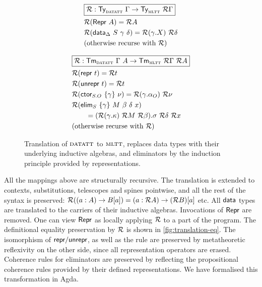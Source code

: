 \begin{figure}
\begin{minipage}[t]{0.5\textwidth}
\begin{align*}
&\boxed{\mathcal{R} : \textsf{Ty}_{{\textsc{datatt}}}\ \Gamma \to \textsf{Ty}_{{\textsc{mltt}}}\ \mathcal{R} \Gamma} \\
&\mathcal{R} (\textsf{Repr}\ A) = \mathcal{R} A \\
&\mathcal{R} (\textsf{data}_{\Delta}\ S\ \gamma\ \delta) = \mathcal{R} (\gamma.X)\ \mathcal{R} \delta \\
&\text{(otherwise recurse with $\mathcal{R}$)}
\end{align*}
\end{minipage}%
\begin{minipage}[t]{0.5\textwidth}
\begin{align*}
&\boxed{\mathcal{R} : \textsf{Tm}_{{\textsc{datatt}}}\ \Gamma\ A \to \textsf{Tm}_{{\textsc{mltt}}}\ \mathcal{R} \Gamma\ \mathcal{R} A} \\
&\mathcal{R} (\textsf{repr}\ t) = \mathcal{R} t \\
&\mathcal{R} (\textsf{unrepr}\ t) = \mathcal{R} t \\
&\mathcal{R} (\textsf{ctor}_{S.O}\ \{\gamma\}\ \nu) = \mathcal{R} (\gamma.\alpha_O)\ \mathcal{R}\nu \\
&\mathcal{R} (\textsf{elim}_{S}\ \{\gamma\}\ M\ \beta\ \delta\ x)  \\ &\qquad = (\mathcal{R} (\gamma.\kappa)\ \mathcal{R} M\ \mathcal{R} \beta).\sigma\ \mathcal{R}\delta\ \mathcal{R} x \\
&\text{(otherwise recurse with $\mathcal{R}$)}
\end{align*}
\end{minipage}
\caption{Translation of ${\textsc{datatt}}$ to ${\textsc{mltt}}$, replaces data types
with their underlying inductive algebras, and eliminators by the induction
principle provided by representations.}
\label{fig:translation}
\end{figure}

All the mappings above are structurally recursive. The translation is
extended to contexts, substitutions, telescopes and spines pointwise, and all
the rest of the syntax is preserved: $\mathcal{R}((a : A) \to B[a]) = (a : \mathcal{R} A) \to (\mathcal{R}
B)[a]$ etc. All $\textsf{data}$ types are translated to the carriers of their inductive
algebras. Invocations of $\textsf{Repr}$ are removed. One can view $\textsf{Repr}$ as locally
applying $\mathcal{R}$ to a part of the program. The definitional equality preservation
by $\mathcal{R}$ is shown in \cref{fig:translation-eq}. The isomorphism of
$\textsf{repr}/\textsf{unrepr}$, as well as the rule \hyperlink{Repr-Data}{} are preserved by
metatheoretic reflexivity on the other side, since all representation operators
are erased. Coherence rules for eliminators are preserved by reflecting the
propositional coherence rules provided by their defined representations. We have
formalised this transformation in Agda.

